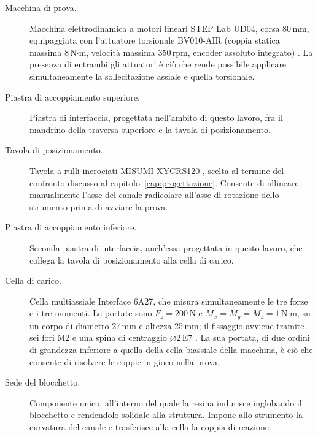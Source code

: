 \begin{description}

  \item[Macchina di prova.] Macchina elettrodinamica a motori lineari
    STEP Lab UD04, corsa 80\,mm, equipaggiata con l'attuatore torsionale
    BV010-AIR (coppia statica massima 8\,N$\cdot$m, velocità massima 350\,rpm,
    encoder assoluto integrato) \cite[pp.~6, 10]{steplab2024}. La presenza di
    entrambi gli attuatori è ciò che rende possibile applicare simultaneamente
    la sollecitazione assiale e quella torsionale.

  \item[Piastra di accoppiamento superiore.] Piastra di interfaccia,
    progettata nell'ambito di questo lavoro, fra il mandrino della traversa
    superiore e la tavola di posizionamento.

  \item[Tavola di posizionamento.] Tavola a rulli incrociati MISUMI
    XYCRS120 \cite[pp.~1941--1942]{misumi2014}, scelta al termine del
    confronto discusso al capitolo~\ref{cap:progettazione}. Consente di
    allineare manualmente l'asse del canale radicolare all'asse di rotazione
    dello strumento prima di avviare la prova.

  \item[Piastra di accoppiamento inferiore.] Seconda piastra di interfaccia,
    anch'essa progettata in questo lavoro, che collega la tavola di
    posizionamento alla cella di carico.

  \item[Cella di carico.] Cella multiassiale Interface 6A27, che misura
    simultaneamente le tre forze e i tre momenti. Le portate sono
    $F_z = 200$\,N e $M_x = M_y = M_z = 1$\,N$\cdot$m, su un corpo di diametro
    27\,mm e altezza 25\,mm; il fissaggio avviene tramite sei fori M2 e una
    spina di centraggio $\varnothing$2\,E7 \cite{interface6a}. La sua portata, di due ordini di
    grandezza inferiore a quella della cella biassiale della macchina, è ciò
    che consente di risolvere le coppie in gioco nella prova.

  \item[Sede del blocchetto.] Componente unico, all'interno del quale la resina
    indurisce inglobando il blocchetto e rendendolo solidale alla struttura.
    Impone allo strumento la curvatura del canale e trasferisce alla cella la
    coppia di reazione.


\end{description}
